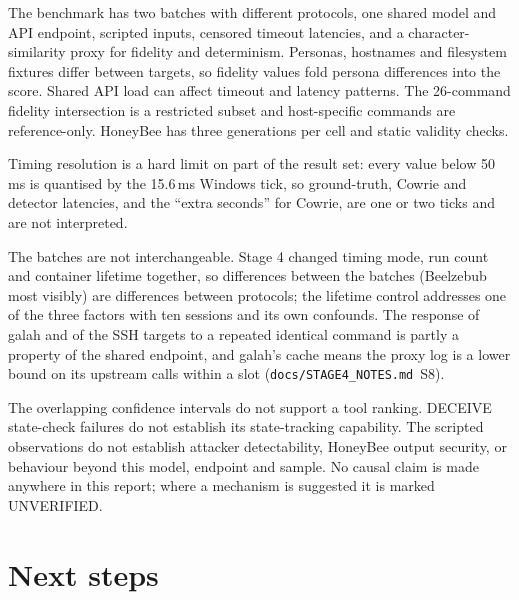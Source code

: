 \documentclass[a4paper,11pt]{article}
\begin{document}
The benchmark has two batches with different protocols, one shared model and
API endpoint, scripted inputs, censored timeout latencies, and a
character-similarity proxy for fidelity and determinism. Personas, hostnames
and filesystem fixtures differ between targets, so fidelity values fold persona
differences into the score. Shared API load can affect timeout and latency
patterns. The 26-command fidelity intersection is a restricted subset and
host-specific commands are reference-only. HoneyBee has three generations per
cell and static validity checks.

Timing resolution is a hard limit on part of the result set: every value below
50\,ms is quantised by the 15.6\,ms Windows tick, so ground-truth, Cowrie and
detector latencies, and the ``extra seconds'' for Cowrie, are one or two ticks
and are not interpreted.

The batches are not interchangeable. Stage 4 changed timing mode, run count
and container lifetime together, so differences between the batches
(Beelzebub most visibly) are differences between protocols; the lifetime
control addresses one of the three factors with ten sessions and its own
confounds. The response of galah and of the SSH targets to a repeated identical
command is partly a property of the shared endpoint, and galah's cache means
the proxy log is a lower bound on its upstream calls within a slot
(\texttt{docs/STAGE4\_NOTES.md}~S8).

The overlapping confidence intervals do not support a tool ranking. DECEIVE
state-check failures do not establish its state-tracking capability. The
scripted observations do not establish attacker detectability, HoneyBee output
security, or behaviour beyond this model, endpoint and sample. No causal claim
is made anywhere in this report; where a mechanism is suggested it is marked
UNVERIFIED.

\section{Next steps}
\end{document}
